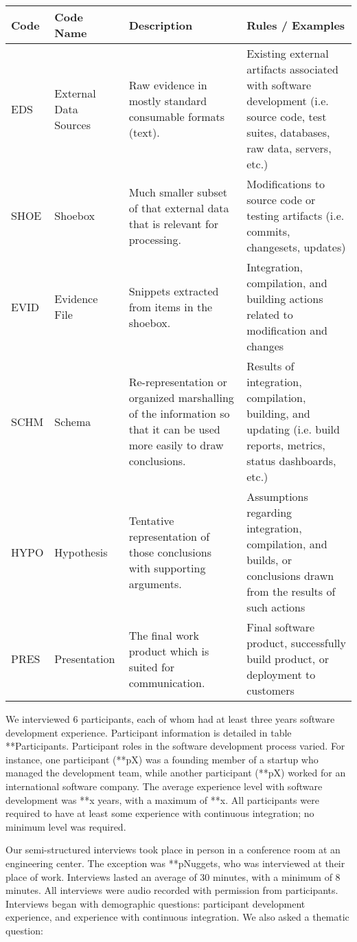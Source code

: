 \documentclass{sig-alternate-05-2015}
\begin{document}
\begin{table}[b]
\begin{tabular}[b]{ | l | l | l | l | }
	\hline
	Code & Code Name & Description & Rules / Examples \\ \hline
	EDS & External Data Sources & Raw evidence in mostly standard consumable formats (text). & Existing external artifacts associated with software development (i.e. source code, test suites, databases, raw data, servers, etc.) \\ \hline
	SHOE & Shoebox & Much smaller subset of that external data that is relevant for processing. & Modifications to source code or testing artifacts (i.e. commits, changesets, updates) \\ \hline
	EVID & Evidence File & Snippets extracted from items in the shoebox. & Integration, compilation, and building actions related to modification and changes \\ \hline
	SCHM & Schema & Re-representation or organized marshalling of the information so that it can be used more easily to draw conclusions. & Results of integration, compilation, building, and updating (i.e. build reports, metrics, status dashboards, etc.) \\ \hline
	HYPO & Hypothesis & Tentative representation of those conclusions with supporting arguments. & Assumptions regarding integration, compilation, and builds, or conclusions drawn from the results of such actions \\ \hline
	PRES & Presentation & The final work product which is suited for communication. & Final software product, successfully build product, or deployment to customers \\ \hline
\end{tabular}
\end{table}

We interviewed 6 participants, each of whom had at least three years software development experience. Participant information is detailed in table **Participants. Participant roles in the software development process varied. For instance, one participant (**pX) was a founding member of a startup who managed the development team, while another participant (**pX) worked for an international software company. The average experience level with software development was **x years, with a maximum of **x. All participants were required to have at least some experience with continuous integration; no minimum level was required.

Our semi-structured interviews took place in person in a conference room at an engineering center. The exception was **pNuggets, who was interviewed at their place of work. Interviews lasted an average of 30 minutes, with a minimum of 8 minutes. All interviews were audio recorded with permission from participants.  Interviews began with demographic questions: participant development experience, and experience with continuous integration. We also asked a thematic question:
\end{document}
